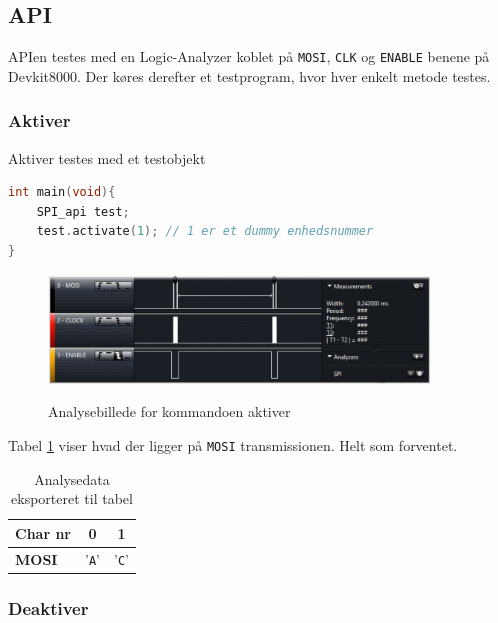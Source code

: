 
\subsection{API}

APIen testes med en Logic-Analyzer koblet på \verb+MOSI+, \verb+CLK+ og \verb+ENABLE+ benene på Devkit8000. Der køres derefter et testprogram, hvor hver enkelt metode testes.


\subsubsection*{Aktiver}

Aktiver testes med et testobjekt

\begin{lstlisting}[language=C]
int main(void){
	SPI_api test;
	test.activate(1); // 1 er et dummy enhedsnummer
}
\end{lstlisting}

\begin{figure}[H]
\centering
{\includegraphics[width=0.90\textwidth]{filer/modultest/Billeder/mt_activate}}
\caption{Analysebillede for kommandoen aktiver}
\label{lab:mt_activate}
\end{figure}

Tabel \ref{table:mt_activate} viser hvad der ligger på \verb+MOSI+ transmissionen. Helt som forventet.

\begin{table}[H]
	\caption{Analysedata eksporteret til tabel}
	\centering
	\begin{tabular}{|l|c|c|}
		\hline 
		\textbf{Char nr} & \textbf{0} & \textbf{1} \\ 		
		\hline 
		\textbf{MOSI} & '\verb+A+' & '\verb+C+' \\ 
		\hline 
	\end{tabular} 
	\label{table:mt_activate}
\end{table}


\subsubsection*{Deaktiver}


